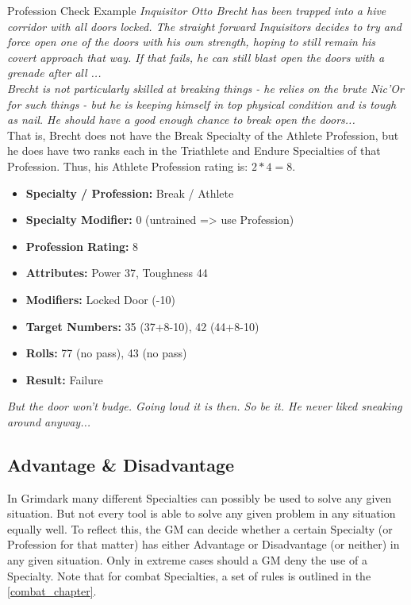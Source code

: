 	\begin{DndSidebar}{Profession Check Example}
	\textit{Inquisitor Otto Brecht has been trapped into a hive corridor with all doors locked. The straight forward Inquisitors decides to try and force open one of the doors with his own strength, hoping to still remain his covert approach that way. If that fails, he can still blast open the doors with a grenade after all ...\\
	\noindent
	Brecht is not particularly skilled at breaking things - he relies on the brute Nic'Or for such things - but he is keeping himself in top physical condition and is tough as nail. He should have a good enough chance to break open the doors...}\\
	\noindent
	That is, Brecht does not have the Break Specialty of the Athlete Profession, but he does have two ranks each in the Triathlete and Endure Specialties of that Profession. Thus, his Athlete Profession rating is: $2*4=8$.
		\begin{itemize}
		\item \textbf{Specialty / Profession:} Break / Athlete
		\item \textbf{Specialty Modifier:} 0 (untrained => use Profession)
		\item \textbf{Profession Rating:} 8
		\item \textbf{Attributes:} Power 37, Toughness 44
		\item \textbf{Modifiers:} Locked Door (-10)
		\item \textbf{Target Numbers:} 35 (37+8-10), 42 (44+8-10)
		\item \textbf{Rolls:} 77 (no pass), 43 (no pass)
		\item \textbf{Result:} Failure
	\end{itemize}
	\textit{But the door won't budge. Going loud it is then. So be it. He never liked sneaking around anyway...}
	\end{DndSidebar}

\subsection{Advantage \& Disadvantage}\label{Synergy}
	In Grimdark many different Specialties can possibly be used to solve any given situation.
	But not every tool is able to solve any given problem in any situation equally well.
	To reflect this, the GM can decide whether a certain Specialty (or Profession for that matter) has either Advantage or Disadvantage (or neither) in any given situation.
	Only in extreme cases should a GM deny the use of a Specialty.
	Note that for combat Specialties, a set of rules is outlined in the \ref{combat_chapter}.

